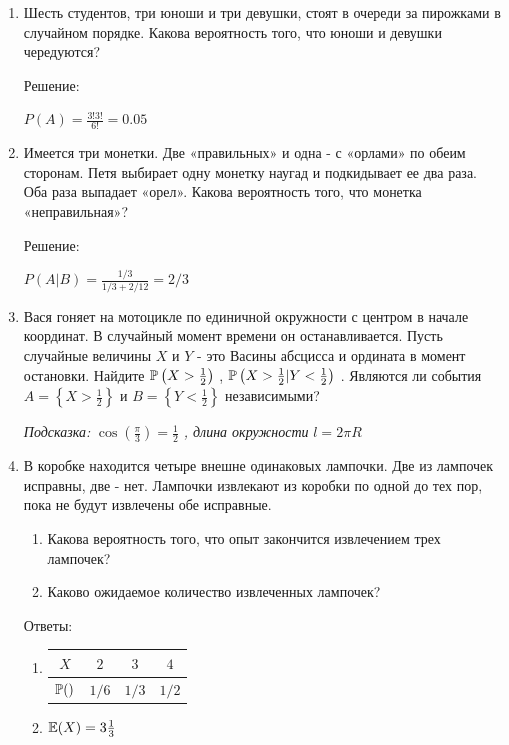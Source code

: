 \documentclass[12pt, a4paper]{article}\usepackage[]{graphicx}\usepackage[]{color}
\begin{document}
\begin{enumerate}
\item Шесть студентов, три юноши и три девушки, стоят в очереди за пирожками в случайном порядке. Какова вероятность того, что юноши и девушки чередуются?

Решение:

$P(A)=\frac{3!3!}{6!}=0.05$

\item Имеется три монетки. Две «правильных» и одна - с «орлами» по обеим сторонам. Петя выбирает одну монетку наугад и подкидывает ее два раза. Оба раза выпадает «орел». Какова вероятность того, что монетка «неправильная»?

Решение:

$P(A|B)=\frac{1/3}{1/3+2/12}=2/3$

\item Вася гоняет на мотоцикле по единичной окружности с центром в начале координат. В случайный момент времени он останавливается. Пусть случайные величины  $X$  и  $Y$  - это Васины абсцисса и ордината в момент остановки. Найдите  $\P\left(X>\frac{1}{2} \right)$ ,  $\P\left(X>\frac{1}{2} |Y<\frac{1}{2} \right)$ . Являются ли события  $A=\left\{X>\frac{1}{2} \right\}$  и  $B=\left\{Y<\frac{1}{2} \right\}$  независимыми?

{\it Подсказка: } $\cos\left(\frac{\pi }{3} \right)=\frac{1}{2} $ {\it , длина окружности } $l=2\pi R$

\item В коробке находится четыре внешне одинаковых лампочки. Две из лампочек исправны, две - нет. Лампочки извлекают из коробки по одной до тех пор, пока не будут извлечены обе исправные.
\begin{enumerate}
\item	Какова вероятность того, что опыт закончится извлечением трех лампочек?
\item Каково ожидаемое количество извлеченных лампочек?
\end{enumerate}

Ответы:
\begin{enumerate}
\item
\begin{tabular}{c|ccc}
$X$ & $2$ & $3$ & $4$ \\
\hline
$\P()$ & $1/6$ & $1/3$ & $1/2$ \\
\end{tabular}
\item $\E(X)=3\frac{1}{3}$
\end{enumerate}


\end{enumerate}
\end{document}

